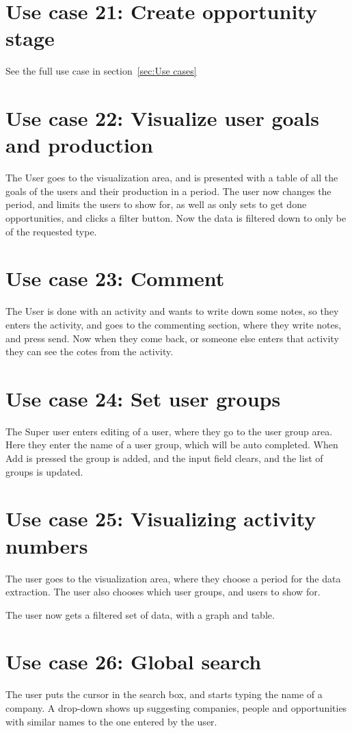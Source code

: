 \section{Use case 21: Create opportunity stage }
See the full use case in section~\ref{sec:Use cases}

\section{Use case 22: Visualize user goals and production}
\label{app:usecase:visualizegoalsproduction}
The User goes to the visualization area, and is presented with a table of all
the goals of the users and their production in a period. The user now changes
the period, and limits the users to show for, as well as only sets to get done
opportunities, and clicks a filter button. Now the data is filtered down to only
be of the requested type. 

\section{Use case 23: Comment}
The User is done with an activity and wants to write down some notes, so they
enters the activity, and goes to the commenting section, where they write notes,
and press send. Now when they come back, or someone else enters that activity
they can see the cotes from the activity. 

\section{Use case 24: Set user groups }
The Super user enters editing of a user, where they go to the user group area.
Here they enter the name of a user group, which will be auto completed. When Add
is pressed the group is added, and the input field clears, and the list of
groups is updated.

\section{Use case 25: Visualizing activity numbers}
The user goes to the visualization area, where they choose a period for the
data extraction. The user also chooses which user groups, and users to show for.

The user now gets a filtered set of data, with a graph and table.

\section{Use case 26: Global search}
The user puts the cursor in the search box, and starts typing the name of a
company. A drop-down shows up suggesting companies, people and opportunities with
similar names to the one entered by the user.

